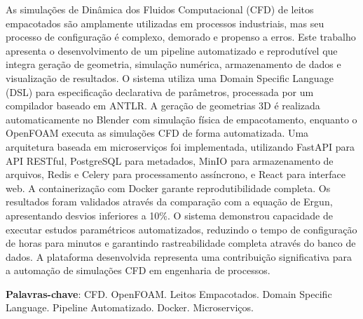 \begin{resumo}
As simulações de Dinâmica dos Fluidos Computacional (CFD) de leitos empacotados são amplamente utilizadas em processos industriais, mas seu processo de configuração é complexo, demorado e propenso a erros. Este trabalho apresenta o desenvolvimento de um pipeline automatizado e reprodutível que integra geração de geometria, simulação numérica, armazenamento de dados e visualização de resultados. O sistema utiliza uma Domain Specific Language (DSL) para especificação declarativa de parâmetros, processada por um compilador baseado em ANTLR. A geração de geometrias 3D é realizada automaticamente no Blender com simulação física de empacotamento, enquanto o OpenFOAM executa as simulações CFD de forma automatizada. Uma arquitetura baseada em microserviços foi implementada, utilizando FastAPI para API RESTful, PostgreSQL para metadados, MinIO para armazenamento de arquivos, Redis e Celery para processamento assíncrono, e React para interface web. A containerização com Docker garante reprodutibilidade completa. Os resultados foram validados através da comparação com a equação de Ergun, apresentando desvios inferiores a 10\%. O sistema demonstrou capacidade de executar estudos paramétricos automatizados, reduzindo o tempo de configuração de horas para minutos e garantindo rastreabilidade completa através do banco de dados. A plataforma desenvolvida representa uma contribuição significativa para a automação de simulações CFD em engenharia de processos.

\textbf{Palavras-chave}: CFD. OpenFOAM. Leitos Empacotados. Domain Specific Language. Pipeline Automatizado. Docker. Microserviços.
\end{resumo}

